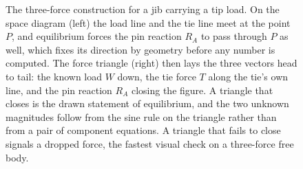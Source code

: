 \begin{figure}[htbp]
\caption[Three-force graphical construction]{The three-force construction for
a jib carrying a tip load. On the space diagram (left) the load line and the
tie line meet at the point $P$, and equilibrium forces the pin reaction $R_A$
to pass through $P$ as well, which fixes its direction by geometry before any
number is computed. The force triangle (right) then lays the three vectors head
to tail: the known load $W$ down, the tie force $T$ along the tie's own line,
and the pin reaction $R_A$ closing the figure. A triangle that closes is the
drawn statement of equilibrium, and the two unknown magnitudes follow from the
sine rule on the triangle rather than from a pair of component equations. A
triangle that fails to close signals a dropped force, the fastest visual check
on a three-force free body.}
\label{fig:vol03ch02:three-force-graphical}
\end{figure}
